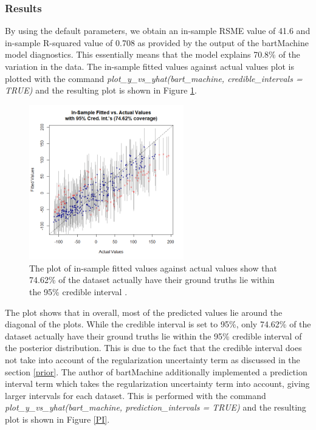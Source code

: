 \documentclass{usiinftr}
\begin{document}
\subsubsection{Results}
By using the default parameters, we obtain an in-sample RSME value of 41.6 and in-sample R-squared value of 0.708 as provided by the output of the bartMachine model diagnostics. This essentially means that the model explains 70.8\% of the variation in the data. The in-sample fitted values against actual values plot is plotted with the command \textit{plot\_y\_vs\_yhat(bart\_machine, credible\_intervals = TRUE)} and the resulting plot is shown in Figure \ref{CI}.


\begin{figure}[h!] 
\centering
\includegraphics[width=0.6\textwidth]{images/CI.png}
\caption{The plot of in-sample fitted values against actual values show that 74.62\% of the dataset actually have their ground truths lie within the 95\% credible interval .}
\label{CI}
\end{figure}

The plot shows that in overall, most of the predicted values lie around the diagonal of the plots. While the credible interval is set to 95\%, only 74.62\% of the dataset actually have their ground truths lie within the 95\% credible interval of the posterior distribution. This is due to the fact that the credible interval does not take into account of the regularization uncertainty term as discussed in the section \ref{prior}. The author of bartMachine additionally implemented a prediction interval term which takes the regularization uncertainty term into account, giving larger intervals for each dataset. This is performed with the command \textit{plot\_y\_vs\_yhat(bart\_machine, prediction\_intervals = TRUE)} and the resulting plot is shown in Figure \ref{PI}.
\end{document}
